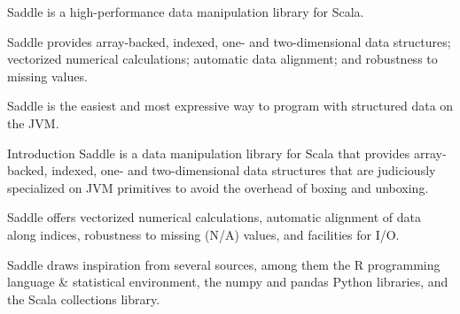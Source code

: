 Saddle is a high-performance data manipulation library for Scala.

Saddle provides array-backed, indexed, one- and two-dimensional data structures; vectorized numerical calculations; automatic data alignment; and robustness to missing values.

Saddle is the easiest and most expressive way to program with structured data on the JVM.

Introduction
Saddle is a data manipulation library for Scala that provides array-backed, indexed, one- and two-dimensional data structures that are judiciously specialized on JVM primitives to avoid the overhead of boxing and unboxing.

Saddle offers vectorized numerical calculations, automatic alignment of data along indices, robustness to missing (N/A) values, and facilities for I/O.

Saddle draws inspiration from several sources, among them the R programming language & statistical environment, the numpy and pandas Python libraries, and the Scala collections library.
